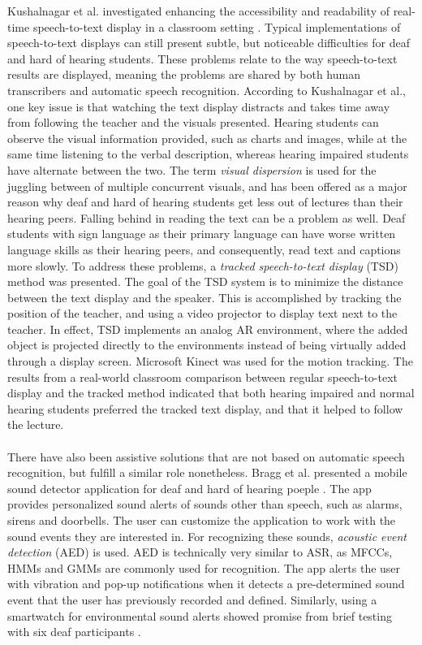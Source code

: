 \documentclass[english, 12pt, a4paper, pdftex, elec, utf8]{aaltothesis}
\begin{document}
Kushalnagar et al. investigated enhancing the accessibility and readability of real-time speech-to-text display in a classroom setting \cite{kushalnagar2015tracked}. Typical implementations of speech-to-text displays can still present subtle, but noticeable difficulties for deaf and hard of hearing students. These problems relate to the way speech-to-text results are displayed, meaning the problems are shared by both human transcribers and automatic speech recognition. According to Kushalnagar et al., one key issue is that watching the text display distracts and takes time away from following the teacher and the visuals presented. Hearing students can observe the visual information provided, such as charts and images, while at the same time listening to the verbal description, whereas hearing impaired students have alternate between the two. The term \textit{visual dispersion} is used for the juggling between of multiple concurrent visuals, and has been offered as a major reason why deaf and hard of hearing students get less out of lectures than their hearing peers. Falling behind in reading the text can be a problem as well. Deaf students with sign language as their primary language can have worse written language skills as their hearing peers, and consequently, read text and captions more slowly. To address these problems, a \textit{tracked speech-to-text display} (TSD) method was presented. The goal of the TSD system is to minimize the distance between the text display and the speaker. This is accomplished by tracking the position of the teacher, and using a video projector to display text next to the teacher. In effect, TSD implements an analog AR environment, where the added object is projected directly to the environments instead of being virtually added through a display screen. Microsoft Kinect was used for the motion tracking. The results from a real-world classroom comparison between regular speech-to-text display and the tracked method indicated that both hearing impaired and normal hearing students preferred the tracked text display, and that it helped to follow the lecture. \\\\
There have also been assistive solutions that are not based on automatic speech recognition, but fulfill a similar role nonetheless. Bragg et al. presented a mobile sound detector application for deaf and hard of hearing poeple \cite{bragg2016personalizable}. The app provides personalized sound alerts of sounds other than speech, such as alarms, sirens and doorbells. The user can customize the application to work with the sound events they are interested in. For recognizing these sounds, \textit{acoustic event detection} (AED) is used. AED is technically very similar to ASR, as MFCCs, HMMs and GMMs are commonly used for recognition. The app alerts the user with vibration and pop-up notifications when it detects a pre-determined sound event that the user has previously recorded and defined. Similarly, using a smartwatch for environmental sound alerts showed promise from brief testing with six deaf participants \cite{mielke2015pilot}. \\\\
\end{document}
